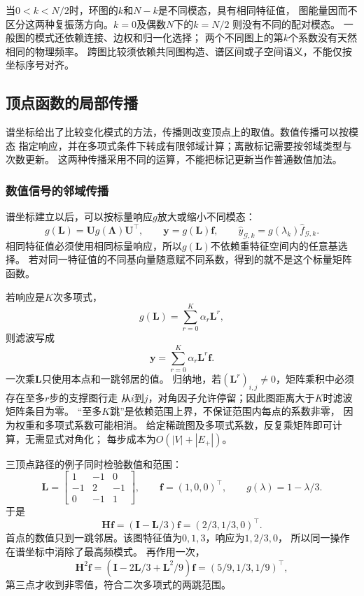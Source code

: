 当\(0<k<N/2\)时，环图的\(k\)和\(N-k\)是不同模态，具有相同特征值，
图能量因而不区分这两种复振荡方向。\(k=0\)及偶数\(N\)下的\(k=N/2\)
则没有不同的配对模态。
一般图的模式还依赖连接、边权和归一化选择；
两个不同图上的第\(k\)个系数没有天然相同的物理频率。
跨图比较须依赖共同图构造、谱区间或子空间语义，不能仅按坐标序号对齐。

\subsection{顶点函数的局部传播}

谱坐标给出了比较变化模式的方法，传播则改变顶点上的取值。数值传播可以按模态
指定响应，并在多项式条件下转成有限邻域计算；离散标记需要按邻域类型与次数更新。
这两种传播采用不同的运算，不能把标记更新当作普通数值加法。

\subsubsection{数值信号的邻域传播}

谱坐标建立以后，可以按标量响应\(g\)放大或缩小不同模态：
\[
  g(\bm L)=\bm U g(\bm\Lambda)\bm U^\top,\qquad
  \bm y=g(\bm L)\bm f,\qquad
  \widehat y_{\mathcal G,k}=g(\lambda_k)\widehat f_{\mathcal G,k}.
\]
相同特征值必须使用相同标量响应，所以\(g(\bm L)\)不依赖重特征空间内的任意基选择。
若对同一特征值的不同基向量随意赋不同系数，得到的就不是这个标量矩阵函数。

若响应是\(K\)次多项式，
\begin{equation}
  g(\bm L)=\sum_{r=0}^K\alpha_r\bm L^r,
  \label{eq:graph-theory-polynomial-filter}
\end{equation}
则滤波写成
\begin{equation}
  \bm y=\sum_{r=0}^K\alpha_r\bm L^r\bm f.
  \label{eq:signal-analysis-polynomial-graph-filter}
\end{equation}
一次乘\(\bm L\)只使用本点和一跳邻居的值。
归纳地，若\((\bm L^r)_{i,j}\neq0\)，矩阵乘积中必须存在至多\(r\)步的支撑图行走
从\(i\)到\(j\)，对角因子允许停留；因此图距离大于\(K\)时滤波矩阵条目为零。
“至多\(K\)跳”是依赖范围上界，不保证范围内每点的系数非零，
因为权重和多项式系数可能相消。
给定稀疏图及多项式系数，反复乘矩阵即可计算，无需显式对角化；
每步成本为\(O(|V|+|E_+|)\)。

三顶点路径的例子同时检验数值和范围：
\[
  \bm L=
  \begin{bmatrix}1&-1&0\\-1&2&-1\\0&-1&1\end{bmatrix},\qquad
  \bm f=(1,0,0)^\top,\qquad g(\lambda)=1-\lambda/3.
\]
于是
\[
  \bm H\bm f=(\bm I-\bm L/3)\bm f=(2/3,1/3,0)^\top.
\]
首点的数值只到一跳邻居。该图特征值为\(0,1,3\)，响应为\(1,2/3,0\)，
所以同一操作在谱坐标中消除了最高频模式。
再作用一次，
\[
  \bm H^2\bm f
  =(\bm I-2\bm L/3+\bm L^2/9)\bm f=(5/9,1/3,1/9)^\top,
\]
第三点才收到非零值，符合二次多项式的两跳范围。

